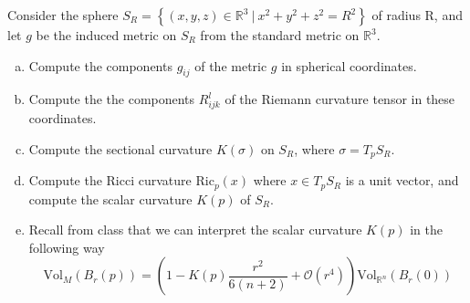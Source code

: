 \documentclass[a4paper]{article}
\begin{document}
Consider the sphere $S_R = \left\{ (x,y,z) \in \mathds{R}^3\ |\ x^2 + y^2 + z^2 = R^2 \right\}$ of radius R, and let $g$ be the induced metric on $S_R$ from the standard metric on $\mathds{R}^3$. 
\begin{enumerate}[(a)]
  \item Compute the components $g_{ij}$ of the metric $g$ in spherical coordinates.
  \item Compute the the components $R_{ijk}^l$ of the Riemann curvature tensor in these coordinates.
  \item Compute the sectional curvature $K(\sigma)$ on $S_R$, where $\sigma = T_pS_R$.
  \item Compute the Ricci curvature $\text{Ric}_p(x)$ where $x \in T_pS_R$ is a unit vector, and compute the scalar curvature $K(p)$ of $S_R$.
  \item Recall from class that we can interpret the scalar curvature $K(p)$ in the following way
    \[
      \text{Vol}_M(B_r(p)) = \left( 1 - K(p) \frac{r^2}{6(n+2)} + \mathcal{O}(r^4) \right)\text{Vol}_{\mathds{R}^n}(B_r(0))
    \]
\end{enumerate}
\end{document}
